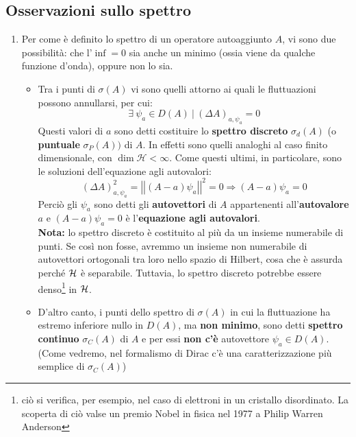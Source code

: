 \documentclass[../../FisicaTeorica.tex]{subfiles}
\begin{document}
\subsection{Osservazioni sullo spettro}
\begin{enumerate}
    \item Per come è definito lo spettro di un operatore autoaggiunto $A$, vi sono due possibilità: che l'$\inf = 0$ sia anche un minimo (ossia viene  da qualche funzione d'onda), oppure non lo sia.
    \begin{itemize}
	\item Tra i punti di $\sigma\left(A\right)$ vi sono quelli attorno ai quali le fluttuazioni possono annullarsi, per cui:
	\[
	\exists\> \psi_a\in D\left(A\right)\>|\>\left(\Delta A\right)_{a,\psi_a}=0
	\]
	Questi valori di $a$ sono detti costituire lo \textbf{spettro discreto} $\sigma_d\left(A\right)$ (o \textbf{puntuale} $\sigma_P(A))$ di $A$. In effetti sono quelli analoghi al caso finito dimensionale, con $\dim{\mathcal{H}}<\infty$. Come questi ultimi, in particolare, sono le soluzioni dell'equazione agli autovalori:
	\[
	\left(\Delta A\right)_{a,\psi_a}^2=\left|\left|\left(A-a\right)\psi_a\right|\right|^2=0\Rightarrow \left(A-a\right)\psi_a=0
	\]
	Perciò gli $\psi_a$ sono detti gli \textbf{autovettori} di $A$ appartenenti all'\textbf{autovalore} $a$ e $\left(A-a\right)\psi_a=0$ è l'\textbf{equazione agli autovalori}.\\
	\textbf{Nota:} lo spettro discreto è costituito al più da un insieme numerabile di punti. Se così non fosse, avremmo un insieme non numerabile di autovettori ortogonali tra loro nello spazio di Hilbert, cosa che è assurda perché $\mathcal{H}$ è separabile. Tuttavia, lo spettro discreto potrebbe essere denso\footnote{ciò si verifica, per esempio, nel caso di elettroni in un cristallo disordinato. La scoperta di ciò valse un premio Nobel in fisica nel 1977 a Philip Warren Anderson} in $\mathcal{H}$.
	\item D'altro canto, i punti dello spettro di $\sigma \left(A\right)$ in cui la fluttuazione ha estremo inferiore nullo in $D(A)$, ma \textbf{non minimo}, sono detti \textbf{spettro continuo} $\sigma_C\left(A\right)$ di $A$ e per essi \textbf{non c'è} autovettore $\psi_a\in D(A)$.\\
	(Come vedremo, nel formalismo di Dirac c'è una caratterizzazione più semplice di $\sigma_C(A)$)\\
	\end{itemize}

\end{enumerate}
\end{document}
